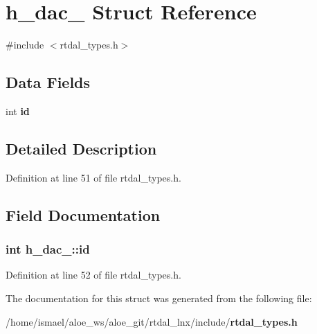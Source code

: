 \section{h\-\_\-dac\-\_\- Struct Reference}
\label{structh__dac__}


{\ttfamily \#include $<$rtdal\-\_\-types.\-h$>$}

\subsection*{Data Fields}
\begin{DoxyCompactItemize}
\item 
int {\bf id}
\end{DoxyCompactItemize}


\subsection{Detailed Description}


Definition at line 51 of file rtdal\-\_\-types.\-h.



\subsection{Field Documentation}
\subsubsection[{id}]{\setlength{\rightskip}{0pt plus 5cm}int h\-\_\-dac\-\_\-\-::id}\label{structh__dac___aeaca55d5cad93c3ca5b3f9d94d188a1d}


Definition at line 52 of file rtdal\-\_\-types.\-h.



The documentation for this struct was generated from the following file\-:\begin{DoxyCompactItemize}
\item 
/home/ismael/aloe\-\_\-ws/aloe\-\_\-git/rtdal\-\_\-lnx/include/{\bf rtdal\-\_\-types.\-h}\end{DoxyCompactItemize}
